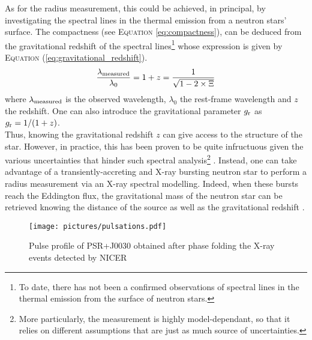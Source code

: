 \documentclass[a4paper, twoside, 12pt]{article}
\numberwithin{equation}{section}
\begin{document}
As for the radius measurement, this could be achieved, in principal,  by investigating the spectral lines in the thermal emission from a neutron stars' surface. The compactness (see E\textsc{quation} \ref{eq:compactness}), can be deduced from the gravitational redshift of the spectral lines\footnote{To date, there has not been a confirmed observations of spectral lines in the thermal emission from the surface of neutron stars.} whose expression is given by E\textsc{quation} (\ref{eq:gravitational_redshift}). 
\begin{equation}
\frac{\lambda_{\rm{measured}}}{\lambda_{0}} = 1 + z = \frac{1}{\sqrt{1-2\times\Xi}}
\label{eq:gravitational_redshift}
\end{equation} 
\noindent where $\lambda_{\rm{measured}}$ is the observed wavelength, $\lambda_{0}$ the rest-frame wavelength and $z$ the redshift. One can also introduce the gravitational parameter $g_{\rm{r}}$ as $g_{\rm{r}} = 1/(1+z)$. \\
Thus, knowing the gravitational redshift $z$ can give access to the structure of the star.   
However, in practice, this has been proven to be quite infructuous given the various uncertainties that hinder such spectral analysis\footnote{More particularly, the measurement is highly model-dependant, so that it relies on different assumptions that are just as much source of uncertainties.} \cite{Bogdanov+2007}. 
Instead, one can take advantage of a transiently-accreting and X-ray bursting neutron star to perform a radius measurement via an X-ray spectral modelling. Indeed, when these bursts reach the Eddington flux, the gravitational mass of the neutron star can be retrieved knowing the distance of the source as well as the gravitational redshift \cite{Baillot}. \\
\begin{figure}[!h]
\centering
\texttt{[image: pictures/pulsations.pdf]}
\caption[Pulse profile of PSR+J0030]{Pulse profile of PSR+J0030 obtained after phase folding the X-ray events detected by NICER  \cite{Riley+19}}
\label{fig:pulsations}
\end{figure}
\end{document}
